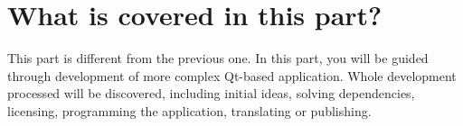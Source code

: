 \chapter{What is covered in this part?}
This part is different from the previous one. In this part, you will be guided through development of more complex Qt-based application. Whole development processed will be discovered, including initial ideas, solving dependencies, licensing, programming the application, translating or publishing.
